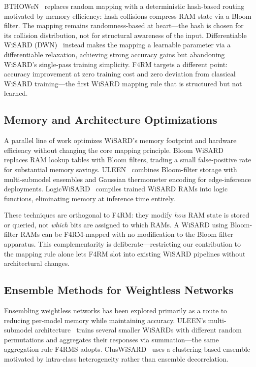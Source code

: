 \documentclass[runningheads]{llncs}
\begin{document}
BTHOWeN~\cite{susskind2022bthowen} replaces random mapping with a deterministic hash-based routing motivated by memory efficiency: hash collisions compress RAM state via a Bloom filter. The mapping remains randomness-based at heart---the hash is chosen for its collision distribution, not for structural awareness of the input. Differentiable WiSARD (DWN)~\cite{bacellar2024dwn} instead makes the mapping a learnable parameter via a differentiable relaxation, achieving strong accuracy gains but abandoning WiSARD's single-pass training simplicity. F4RM targets a different point: accuracy improvement at zero training cost and zero deviation from classical WiSARD training---the first WiSARD mapping rule that is structured but not learned.

\subsection{Memory and Architecture Optimizations}
\label{sec:related-memory}

A parallel line of work optimizes WiSARD's memory footprint and hardware efficiency without changing the core mapping principle. Bloom WiSARD~\cite{santiago2020bloom} replaces RAM lookup tables with Bloom filters, trading a small false-positive rate for substantial memory savings. ULEEN~\cite{susskind2023uleen} combines Bloom-filter storage with multi-submodel ensembles and Gaussian thermometer encoding for edge-inference deployments. LogicWiSARD~\cite{bacellar2022logicwisard} compiles trained WiSARD RAMs into logic functions, eliminating memory at inference time entirely.

These techniques are orthogonal to F4RM: they modify \emph{how} RAM state is stored or queried, not \emph{which} bits are assigned to which RAMs. A WiSARD using Bloom-filter RAMs can be F4RM-mapped with no modification to the Bloom filter apparatus. This complementarity is deliberate---restricting our contribution to the mapping rule alone lets F4RM slot into existing WiSARD pipelines without architectural changes.

\subsection{Ensemble Methods for Weightless Networks}
\label{sec:related-ensemble}

Ensembling weightless networks has been explored primarily as a route to reducing per-model memory while maintaining accuracy. ULEEN's multi-submodel architecture~\cite{susskind2023uleen} trains several smaller WiSARDs with different random permutations and aggregates their responses via summation---the same aggregation rule F4RMS adopts. ClusWiSARD~\cite{cardoso2017clus} uses a clustering-based ensemble motivated by intra-class heterogeneity rather than ensemble decorrelation.
\end{document}
